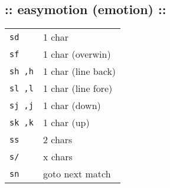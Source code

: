 \subsection{:: easymotion (emotion) ::}
\begin{tabular}{@{}ll@{}}
    \verb!sd!     & 1 char \\
    \verb!sf!     & 1 char (overwin) \\
    \verb!sh ,h!  & 1 char (line back) \\
    \verb!sl ,l!  & 1 char (line fore) \\
    \verb!sj ,j!  & 1 char (down) \\
    \verb!sk ,k!  & 1 char (up) \\
    \verb!ss!     & 2 chars \\
    \verb!s/!     & x chars \\
    \verb!sn!     & goto next match \\
\end{tabular}

